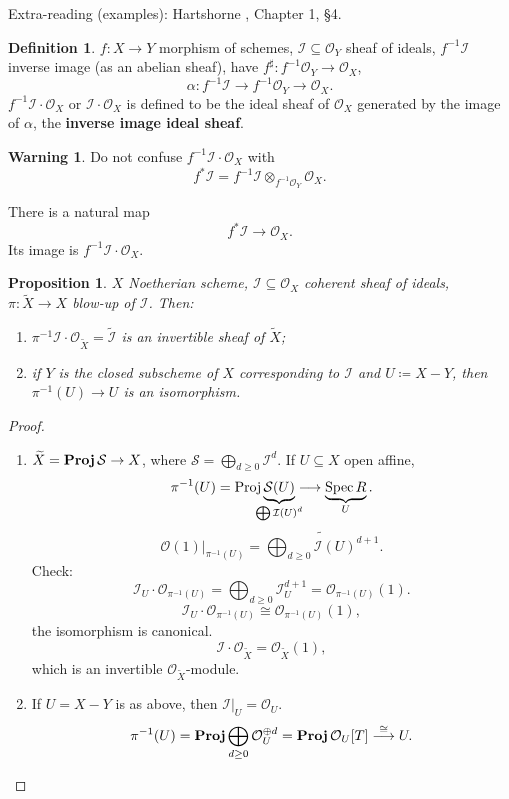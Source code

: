 \documentclass[12pt]{article}
\DeclareMathOperator{\Spec}{Spec}
\DeclareMathOperator{\Proj}{Proj}
\DeclareMathOperator{\relProj}{\textnormal{\textbf{Proj}}}
\newtheorem*{proposition}{Proposition}
\theoremstyle{definition}
\newtheorem*{definition}{Definition}
\newtheorem*{warning}{Warning}
\theoremstyle{remark}
\begin{document}
Extra-reading (examples): Hartshorne \cite{hartshorne2013algebraic}, Chapter 1, \S 4.

\begin{definition}
$f:X\rightarrow Y$ morphism of schemes, $\mathcal{I}\subseteq\mathcal{O}_Y$ sheaf of ideals, $f^{-1}\mathcal{I}$ inverse image (as an abelian sheaf), have $f^{\sharp}:f^{-1}\mathcal{O}_Y\rightarrow\mathcal{O}_X$,
\[\alpha:f^{-1}\mathcal{I}\longrightarrow f^{-1}\mathcal{O}_Y\longrightarrow\mathcal{O}_X.\]
$f^{-1}\mathcal{I}\cdot\mathcal{O}_X$ or $\mathcal{I}\cdot\mathcal{O}_X$ is defined to be the ideal sheaf of $\mathcal{O}_X$ generated by the image of $\alpha$, the \textbf{inverse image ideal sheaf}.
\end{definition}

\begin{warning}
Do not confuse $f^{-1}\mathcal{I}\cdot\mathcal{O}_X$ with
\[f^*\mathcal{I}=f^{-1}\mathcal{I}\otimes_{f^{-1}\mathcal{O}_Y}\mathcal{O}_X.\]

There is a natural map
\[f^*\mathcal{I}\longrightarrow\mathcal{O}_X.\]
Its image is $f^{-1}\mathcal{I}\cdot\mathcal{O}_X$.
\end{warning}

\begin{proposition}
$X$ Noetherian scheme, $\mathcal{I}\subseteq\mathcal{O}_X$ coherent sheaf of ideals, $\pi:\widetilde{X}\rightarrow X$ blow-up of $\mathcal{I}$. Then:
\begin{enumerate}[label=\arabic*)]
\item $\pi^{-1}\mathcal{I}\cdot\mathcal{O}_{\widetilde{X}}=\widetilde{\mathcal{I}}$ is an invertible sheaf of $\widetilde{X}$;
\item if $Y$ is the closed subscheme of $X$ corresponding to $\mathcal{I}$ and $U\coloneqq X-Y$, then $\pi^{-1}(U)\rightarrow U$ is an isomorphism.
\end{enumerate}
\end{proposition}

\begin{proof}
\begin{enumerate}[label=\arabic*)]
\item $\widetilde{X}=\relProj\mathcal{S}\rightarrow X$, where $\mathcal{S}=\bigoplus_{d\geq0}\mathcal{I}^d$. If $U\subseteq X$ open affine,
\[\pi^{-1}(U)=\Proj\underbrace{\mathcal{S}(U)}_{\mathclap{\bigoplus\mathcal{I}(U)^d}}\longrightarrow\underbrace{\Spec R}_U.\]
\[\mathcal{O}(1)|_{\pi^{-1}(U)}=\widetilde{\bigoplus_{d\geq0}\mathcal{I}(U)^{d+1}}.\]
Check:
\[\mathcal{I}_U\cdot\mathcal{O}_{\pi^{-1}(U)}=\bigoplus_{d\geq0}\mathcal{I}_U^{d+1}=\mathcal{O}_{\pi^{-1}(U)}(1).\]
\[\mathcal{I}_U\cdot\mathcal{O}_{\pi^{-1}(U)}\cong\mathcal{O}_{\pi^{-1}(U)}(1),\]
the isomorphism is canonical.
\[\mathcal{I}\cdot\mathcal{O}_{\widetilde{X}}=\mathcal{O}_{\widetilde{X}}(1),\]
which is an invertible $\mathcal{O}_{\widetilde{X}}$-module.

\item If $U=X-Y$ is as above, then $\mathcal{I}|_U=\mathcal{O}_U$.
\[\pi^{-1}(U)=\relProj\bigoplus_{d\geq0}\mathcal{O}_U^{\oplus d}=\relProj\mathcal{O}_U[T]\overset{\cong}{\longrightarrow}U.\]
\end{enumerate}
\end{proof}
\end{document}
